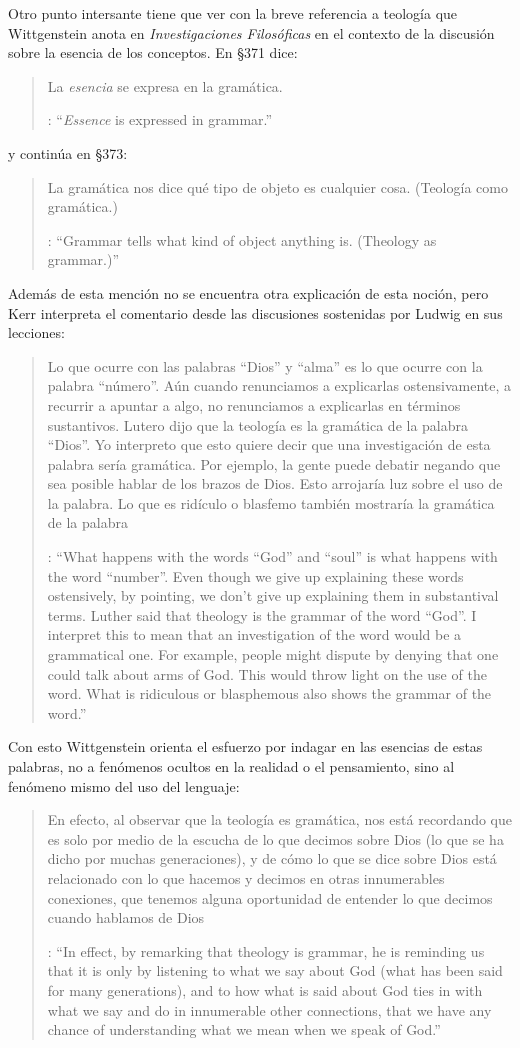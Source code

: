 Otro punto intersante tiene que ver con la breve referencia a teología que Wittgenstein anota en \emph{Investigaciones Filosóficas} en el contexto de la discusión sobre la esencia de los conceptos. En \S371 dice: \blockquote[{\cite[\S371]{wittgenstein1953phiinv}}: \enquote{\emph{Essence} is expressed in grammar.}]{La \emph{esencia} se expresa en la gramática.} y continúa en \S373: \blockquote[{\cite[\S371]{wittgenstein1953phiinv}}: \enquote{Grammar tells what kind of object anything is. (Theology as grammar.)}]{La gramática nos dice qué tipo de objeto es cualquier cosa. (Teología como gramática.)} Además de esta mención no se encuentra otra explicación de esta noción, pero Kerr interpreta el comentario desde las discusiones sostenidas por Ludwig en sus lecciones: \blockquote[{\cite[32]{ambrose2001lectures}}: \enquote{What happens with the words ``God'' and ``soul'' is what happens with the word ``number''. Even though we give up explaining these words ostensively, by pointing, we don't give up explaining them in substantival terms. \textelp{} Luther said that theology is the grammar of the word ``God''. I interpret this to mean that an investigation of the word would be a grammatical one. For example, people might dispute by denying that one could talk about arms of God. This would throw light on the use of the word. What is ridiculous or blasphemous also shows the grammar of the word.}]{Lo que ocurre con las palabras ``Dios'' y ``alma'' es lo que ocurre con la palabra ``número''. Aún cuando renunciamos a explicarlas ostensivamente, a recurrir a apuntar a algo, no renunciamos a explicarlas en términos sustantivos. \textelp{} Lutero dijo que la teología es la gramática de la palabra ``Dios''. Yo interpreto que esto quiere decir que una investigación de esta palabra sería gramática. Por ejemplo, la gente puede debatir negando que sea posible hablar de los brazos de Dios. Esto arrojaría luz sobre el uso de la palabra. Lo que es ridículo o blasfemo también mostraría la gramática de la palabra}. Con esto Wittgenstein orienta el esfuerzo por indagar en las esencias de estas palabras, no a fenómenos ocultos en la realidad o el pensamiento, sino al fenómeno mismo del uso del lenguaje: \blockquote[{\cite[148--149]{kerr1997theo}}: \enquote{In effect, by remarking that theology is grammar, he is reminding us that it is only by listening to what we say about God (what has been said for many generations), and to how what is said about God ties in with what we say and do in innumerable other connections, that we have any chance of understanding what we mean when we speak of God.}]{En efecto, al observar que la teología es gramática, nos está recordando que es solo por medio de la escucha de lo que decimos sobre Dios (lo que se ha dicho por muchas generaciones), y de cómo lo que se dice sobre Dios está relacionado con lo que hacemos y decimos en otras innumerables conexiones, que tenemos alguna oportunidad de entender lo que decimos cuando hablamos de Dios}.
